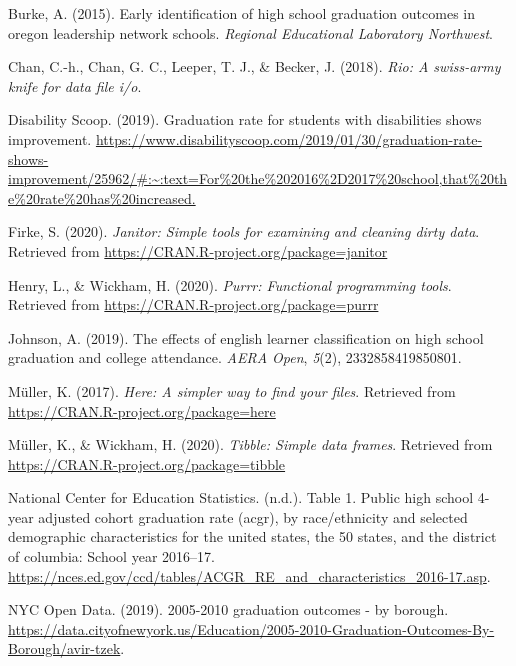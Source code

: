 \documentclass[
  english,
  man, fleqn, noextraspace]{apa6}
\begin{document}
\leavevmode\hypertarget{ref-burke2015early}{}%
Burke, A. (2015). Early identification of high school graduation outcomes in oregon leadership network schools. \emph{Regional Educational Laboratory Northwest}.

\leavevmode\hypertarget{ref-R-rio}{}%
Chan, C.-h., Chan, G. C., Leeper, T. J., \& Becker, J. (2018). \emph{Rio: A swiss-army knife for data file i/o}.

\leavevmode\hypertarget{ref-Graduati54:online}{}%
Disability Scoop. (2019). Graduation rate for students with disabilities shows improvement. \url{https://www.disabilityscoop.com/2019/01/30/graduation-rate-shows-improvement/25962/\#:~:text=For\%20the\%202016\%2D2017\%20school,that\%20the\%20rate\%20has\%20increased.}

\leavevmode\hypertarget{ref-R-janitor}{}%
Firke, S. (2020). \emph{Janitor: Simple tools for examining and cleaning dirty data}. Retrieved from \url{https://CRAN.R-project.org/package=janitor}

\leavevmode\hypertarget{ref-R-purrr}{}%
Henry, L., \& Wickham, H. (2020). \emph{Purrr: Functional programming tools}. Retrieved from \url{https://CRAN.R-project.org/package=purrr}

\leavevmode\hypertarget{ref-johnson2019effects}{}%
Johnson, A. (2019). The effects of english learner classification on high school graduation and college attendance. \emph{AERA Open}, \emph{5}(2), 2332858419850801.

\leavevmode\hypertarget{ref-R-here}{}%
Müller, K. (2017). \emph{Here: A simpler way to find your files}. Retrieved from \url{https://CRAN.R-project.org/package=here}

\leavevmode\hypertarget{ref-R-tibble}{}%
Müller, K., \& Wickham, H. (2020). \emph{Tibble: Simple data frames}. Retrieved from \url{https://CRAN.R-project.org/package=tibble}

\leavevmode\hypertarget{ref-Table1Pu71:online}{}%
National Center for Education Statistics. (n.d.). Table 1. Public high school 4-year adjusted cohort graduation rate (acgr), by race/ethnicity and selected demographic characteristics for the united states, the 50 states, and the district of columbia: School year 2016--17. \url{https://nces.ed.gov/ccd/tables/ACGR_RE_and_characteristics_2016-17.asp}.

\leavevmode\hypertarget{ref-2005201053:online}{}%
NYC Open Data. (2019). 2005-2010 graduation outcomes - by borough. \url{https://data.cityofnewyork.us/Education/2005-2010-Graduation-Outcomes-By-Borough/avir-tzek}.
\end{document}
